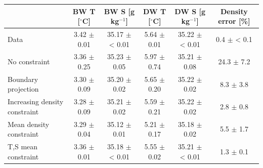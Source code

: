 \begin{tabular}{lccccc}
\toprule
 & BW T [$^\circ$C] & BW S [g kg$^{-1}$] & DW T [$^\circ$C] & DW S [g kg$^{-1}$] & Density error [\%] \\
\midrule
Data & 3.42 $\pm$ 0.01 & 35.17 $\pm$ < 0.01 & 5.64 $\pm$ 0.01 & 35.22 $\pm$ < 0.01 & 0.4 $\pm$ < 0.1 \\
No constraint & 3.36 $\pm$ 0.25 & 35.23 $\pm$ 0.05 & 5.97 $\pm$ 0.74 & 35.21 $\pm$ 0.08 & 24.3 $\pm$ 7.2 \\
Boundary projection & 3.30 $\pm$ 0.09 & 35.20 $\pm$ 0.02 & 5.65 $\pm$ 0.20 & 35.22 $\pm$ 0.02 & 8.3 $\pm$ 3.8 \\
Increasing density constraint & 3.28 $\pm$ 0.09 & 35.21 $\pm$ 0.02 & 5.59 $\pm$ 0.21 & 35.22 $\pm$ 0.02 & 2.8 $\pm$ 0.8 \\
Mean density constraint & 3.29 $\pm$ 0.04 & 35.12 $\pm$ 0.01 & 5.21 $\pm$ 0.17 & 35.18 $\pm$ 0.02 & 5.5 $\pm$ 1.7 \\
T,S mean constraint & 3.36 $\pm$ 0.01 & 35.18 $\pm$ < 0.01 & 5.55 $\pm$ 0.02 & 35.21 $\pm$ < 0.01 & 1.3 $\pm$ 0.1 \\
\bottomrule
\end{tabular}
